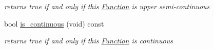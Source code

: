 \begin{Indent}
\begin{DoxyCompactItemize}
\begin{DoxyCompactList}\small\item\em returns true if and only if this \mbox{\hyperlink{class_s_m_spp__di__unipi__it_1_1_function}{Function}} is upper semi-\/continuous \end{DoxyCompactList}\item 
bool \mbox{\hyperlink{class_s_m_spp__di__unipi__it_1_1_function_a59de57710aa301d293e9126e3fb975bf}{is\+\_\+continuous}} (void) const
\begin{DoxyCompactList}\small\item\em returns true if and only if this \mbox{\hyperlink{class_s_m_spp__di__unipi__it_1_1_function}{Function}} is continuous \end{DoxyCompactList}\end{DoxyCompactItemize}
\end{Indent}
